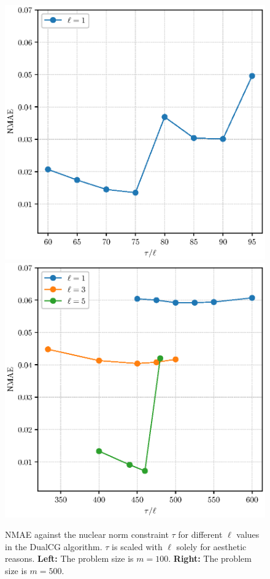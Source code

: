 \documentclass[10pt, twocolumn, reqno, a4paper,oneside]{amsart}
\numberwithin{equation}{section}
\numberwithin{theorem}{section}
\numberwithin{figure}{section}
\numberwithin{table}{section}
\numberwithin{theorem}{section}
\numberwithin{equation}{section}
\begin{document}
\begin{figure}
\centering
\includegraphics[trim = 0 0 0 0, clip, width=0.40\linewidth]{figs/NMAEvsTau_DualCG_M100.eps}
\includegraphics[trim = 0 0 0 0, clip, width=0.40\linewidth]{figs/NMAEvsTau_DualCG_M500.eps}
\caption{NMAE against the nuclear norm constraint $\tau$ for different $\ell$ values in the DualCG algorithm. $\tau$ is scaled with $\ell$ solely for aesthetic reasons. {\bf Left:} The problem size is $m = 100$. {\bf Right:} The problem size is $m = 500$. }\label{fig:NMAEvsTau}
\end{figure}
\end{document}

